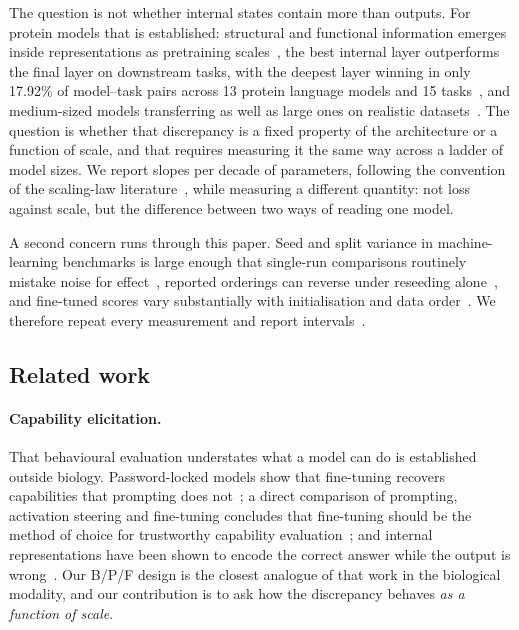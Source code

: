 \documentclass[11pt]{article}
\begin{document}
The question is not whether internal states contain more than outputs. For
protein models that is established: structural and functional information emerges
inside representations as pretraining scales~\citep{rives2021esm1b}, the best
internal layer outperforms the final layer on downstream tasks, with the deepest
layer winning in only 17.92\% of
model--task pairs across 13 protein language models and 15
tasks~\citep{joeres2026taskspecific}, and medium-sized models transferring as
well as large ones on realistic datasets~\citep{vieira2025medium}. The question
is whether that discrepancy is a fixed property of the architecture or a function
of scale, and that requires measuring it the same way across a ladder of model
sizes. We report slopes per decade of parameters, following the convention of the
scaling-law literature~\citep{kaplan2020scaling}, while measuring a different
quantity: not loss against scale, but the difference between two ways of reading
one model.

A second concern runs through this paper. Seed and split variance in
machine-learning benchmarks is large enough that single-run comparisons routinely
mistake noise for effect~\citep{bouthillier2021variance}, reported orderings can
reverse under reseeding alone~\citep{henderson2018deeprl}, and fine-tuned scores
vary substantially with initialisation and data order~\citep{dodge2020finetuning}.
We therefore repeat every measurement and report
intervals~\citep{miller2024errorbars}.

\subsection{Related work}

\paragraph{Capability elicitation.} That behavioural evaluation understates what a
model can do is established outside biology. Password-locked models show that
fine-tuning recovers capabilities that prompting does
not~\citep{greenblatt2024passwordlocked}; a direct comparison of prompting,
activation steering and fine-tuning concludes that fine-tuning should be the
method of choice for trustworthy capability
evaluation~\citep{hofstatter2025elicitation}; and internal representations have
been shown to encode the correct answer while the output is
wrong~\citep{orgad2025llmsknow}. Our B/P/F design is the closest analogue of that
work in the biological modality, and our contribution is to ask how the
discrepancy behaves \emph{as a function of scale}.
\end{document}
